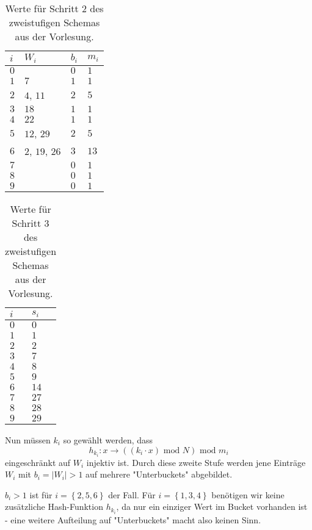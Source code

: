 \documentclass{article}
\begin{document}
\begin{multicols}{2}
\begin{table}[H]
  \centering
  \begin{tabular}{l|l|l|l}
    $i$ & $W_i$           & $b_i$ & $m_i$ \tabularnewline
    \hline\hline
    $0$ &                 & $0$   & $1$   \tabularnewline
    \hline
    $1$ & $7$             & $1$   & $1$   \tabularnewline
    \hline
    $2$ & $4$, $11$       & $2$   & $5$   \tabularnewline
    \hline
    $3$ & $18$            & $1$   & $1$   \tabularnewline
    \hline
    $4$ & $22$            & $1$   & $1$   \tabularnewline
    \hline
    $5$ & $12$, $29$      & $2$   & $5$   \tabularnewline
    \hline
    $6$ & $2$, $19$, $26$ & $3$   & $13$   \tabularnewline
    \hline
    $7$ &                 & $0$   & $1$   \tabularnewline
    \hline
    $8$ &                 & $0$   & $1$   \tabularnewline
    \hline
    $9$ &                 & $0$   & $1$   \tabularnewline
    \hline
  \end{tabular}
  \caption{Werte f{\"u}r Schritt 2 des zweistufigen Schemas aus der Vorlesung.}
  \label{tbl:step-2}
\end{table}
\columnbreak%
\begin{table}[H]
  \centering
  \begin{tabular}{l|l}
    $i$ & $s_i$ \tabularnewline
    \hline\hline
    $0$ & $0$   \tabularnewline
    \hline
    $1$ & $1$   \tabularnewline
    \hline
    $2$ & $2$   \tabularnewline
    \hline
    $3$ & $7$   \tabularnewline
    \hline
    $4$ & $8$   \tabularnewline
    \hline
    $5$ & $9$   \tabularnewline
    \hline
    $6$ & $14$  \tabularnewline
    \hline
    $7$ & $27$  \tabularnewline
    \hline
    $8$ & $28$  \tabularnewline
    \hline
    $9$ & $29$  \tabularnewline
    \hline
  \end{tabular}
  \caption{Werte f{\"u}r Schritt 3 des zweistufigen Schemas aus der Vorlesung.}
  \label{tbl:step-3}
\end{table}
\end{multicols}

Nun m{\"u}ssen $k_i$ so gew{\"a}hlt werden, dass
\begin{equation}
  h_{k_i}: x \longrightarrow \left( \left( k_i \cdot x \right)\text{ mod }N \right)\text{ mod }m_i
  \label{eq:step-2}
\end{equation}
eingeschr{\"a}nkt auf $W_i$ injektiv ist. Durch diese zweite Stufe werden jene
Eintr{\"a}ge $W_i$ mit $b_i = | W_i | > 1$ auf mehrere "Unterbuckets" abgebildet.

$b_i > 1$ ist f{\"u}r $i = \left\{ 2, 5, 6 \right\}$ der Fall. F{\"u}r
$i = \left\{ 1, 3, 4 \right\}$ ben{\"o}tigen wir keine zus{\"a}tzliche
Hash-Funktion $h_{k_i}$, da nur ein einziger Wert im Bucket vorhanden ist - eine
weitere Aufteilung auf "Unterbuckets" macht also keinen Sinn.
\end{document}
